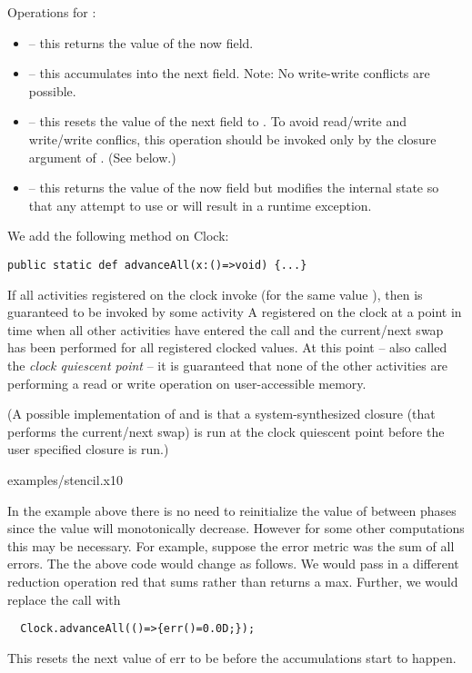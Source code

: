 Operations for :
\begin{itemize}
\item {} -- this returns the value of the now field.
\item{} -- this accumulates  into the next field. Note: No
     write-write conflicts are possible.
\item{} -- this resets the value of the next field to . To avoid
     read/write and write/write conflics, this operation should be
     invoked only by the closure argument of
     . (See below.)
\item {} -- this returns the value of the now field but
     modifies the internal state so that any attempt to use  
     or  will result in a runtime exception.
\end{itemize}

We add the following method on Clock:
\begin{lstlisting}
public static def advanceAll(x:()=>void) {...}
\end{lstlisting}

If all activities registered on the clock invoke 
(for the same value ), then  is guaranteed to be
invoked by some activity A registered on the clock at a point in time
when all other activities have entered the  call
and the current/next swap has been performed for all registered
clocked values.  At this point -- also called the {\em clock quiescent
point} -- it is guaranteed that none of the other activities are
performing a read or write operation on user-accessible memory.

(A possible implementation of  and
 is that a system-synthesized closure (that
performs the current/next swap) is run at the clock quiescent point
before the user specified closure is run.)


 {examples/stencil.x10}


In the example above there is no need to reinitialize the value of
 between phases since the value will monotonically
decrease. However for some other computations this may be
necessary. For example, suppose the error metric was the sum of all
errors. The the above code would change as follows. We would pass in a
different reduction operation red that sums rather than returns a max.
Further, we would replace the  call with
\begin{lstlisting}
  Clock.advanceAll(()=>{err()=0.0D;});
\end{lstlisting}

This resets the next value of err to be  before the accumulations
start to happen.
